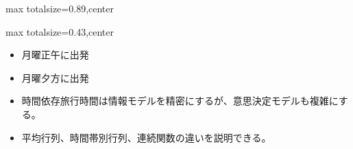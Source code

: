 \begin{minipage}[t]{0.58\textwidth}
\begin{adjustbox}{max totalsize={\textwidth}{0.89\textheight},center}
\begin{minipage}{\textwidth}
\end{minipage}
\end{adjustbox}
\end{minipage}


\clearpage
{}
\begin{minipage}[t]{0.405\textwidth}
\begin{adjustbox}{max totalsize={\textwidth}{0.43\textheight},center}
\begin{minipage}{\textwidth}\scriptsize
{}\begin{itemize}
\item 月曜正午に出発
\item 月曜夕方に出発
\end{itemize}\begin{itemize}
\item 時間依存旅行時間は情報モデルを精密にするが、意思決定モデルも複雑にする。
\item 平均行列、時間帯別行列、連続関数の違いを説明できる。
\end{itemize}
\end{minipage}
\end{adjustbox}
\end{minipage}\hfill
